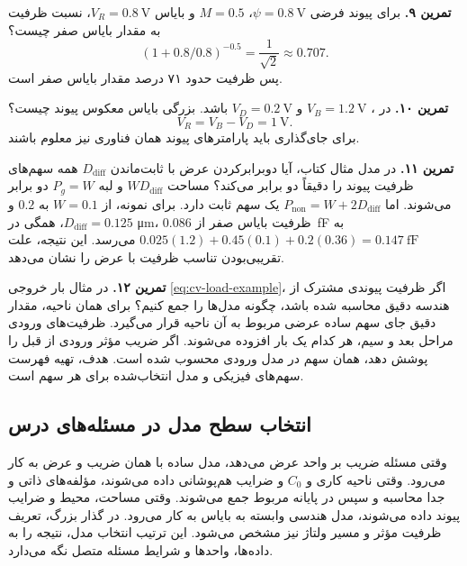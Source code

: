 \textbf{تمرین ۹.} برای پیوند فرضی \(\psi=\qty{0.8}{\volt}\)، \(M=0.5\)
و بایاس \(V_R=\qty{0.8}{\volt}\)، نسبت ظرفیت به مقدار بایاس صفر چیست؟
\[
 (1+0.8/0.8)^{-0.5}=\frac{1}{\sqrt2}\approx0.707.
\]
پس ظرفیت حدود ۷۱ درصد مقدار بایاس صفر است.

\textbf{تمرین ۱۰.} در ، \(V_B=\qty{1.2}{\volt}\) و
\(V_D=\qty{0.2}{\volt}\) باشد. بزرگی بایاس معکوس پیوند  چیست؟
\[
 V_R=V_B-V_D=\qty{1}{\volt}.
\]
برای جای‌گذاری باید پارامترهای پیوند
 همان فناوری نیز معلوم باشند.

\textbf{تمرین ۱۱.} در مدل مثال کتاب، آیا دوبرابرکردن عرض با ثابت‌ماندن
\(D_{\mathrm{diff}}\) همه سهم‌های ظرفیت پیوند را دقیقاً دو برابر می‌کند؟
مساحت \(WD_{\mathrm{diff}}\) و لبه \(P_g=W\) دو برابر می‌شوند.
اما \(P_{\mathrm{non}}=W+2D_{\mathrm{diff}}\) یک سهم ثابت دارد.
برای نمونه، از \(W=0.1\) به \(0.2\) و \(D_{\mathrm{diff}}=0.125\)، همگی
در \unit{\micro\metre}، ظرفیت بایاس صفر از \qty{0.086}{\femto\farad}
به \(0.025(1.2)+0.45(0.1)+0.2(0.36)=\qty{0.147}{\femto\farad}\) می‌رسد.
این نتیجه، علت تقریبی‌بودن تناسب ظرفیت  با عرض را نشان می‌دهد.

\textbf{تمرین ۱۲.} در مثال بار خروجی \eqref{eq:cv-load-example}، اگر
ظرفیت پیوندی مشترک از هندسه دقیق محاسبه شده باشد، چگونه مدل‌ها را جمع کنیم؟
برای همان ناحیه، مقدار دقیق جای سهم ساده عرضی مربوط به آن ناحیه قرار می‌گیرد.
ظرفیت‌های ورودی مراحل بعد و سیم، هر کدام یک بار افزوده می‌شوند.
اگر ضریب مؤثر ورودی از قبل  را پوشش دهد، همان سهم در مدل ورودی
محسوب شده است. هدف، تهیه فهرست سهم‌های فیزیکی و مدل انتخاب‌شده برای هر سهم است.

\subsection{انتخاب سطح مدل در مسئله‌های درس}
وقتی مسئله ضریب بر واحد عرض می‌دهد، مدل ساده با همان ضریب و عرض به کار می‌رود.
وقتی ناحیه کاری و \(C_0\) و ضرایب هم‌پوشانی داده می‌شوند، مؤلفه‌های ذاتی و
 جدا محاسبه و سپس در پایانه مربوط جمع می‌شوند.
وقتی مساحت، محیط و ضرایب پیوند داده می‌شوند، مدل هندسی وابسته به بایاس به کار می‌رود.
در گذار بزرگ، تعریف ظرفیت مؤثر و مسیر ولتاژ نیز مشخص می‌شود.
این ترتیب انتخاب مدل، نتیجه را به داده‌ها، واحدها و شرایط مسئله متصل نگه می‌دارد.
\clearpage
